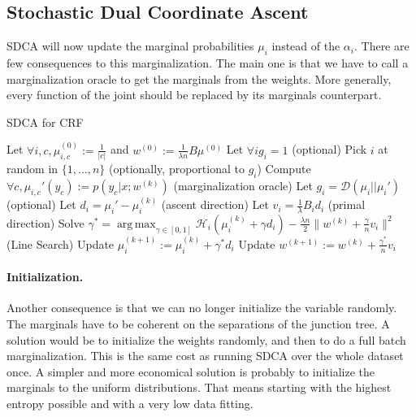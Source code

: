 \documentclass{article}
\DeclareMathOperator{\1}{\mathbb{1}}
\DeclareMathOperator*{\argmax}{arg\,max}
\begin{document}
\subsection{Stochastic Dual Coordinate Ascent}
SDCA will now update the marginal probabilities $\mu_i$ instead of the $\alpha_i$. 
There are few consequences to this marginalization.
The main one is that we have to call a marginalization oracle to get the marginals from the weights.
More generally, every function of the joint should be replaced by its marginals counterpart. 

\begin{algorithm}[ht]
    \caption{SDCA for CRF}%
    \label{sdca for crf}
\begin{algorithmic}
        \STATE Let $\forall i, c, \mu_{i, c}^{(0)} := \frac{1}{|c|}$ and $w^{(0)} := \frac{1}{\lambda n} B \mu^{(0)} $
        \STATE Let $\forall i g_i = 1$ (optional)
                \STATE Pick $i$ at random in $\{1,\ldots,n\}$ (optionally, proportional to $g_i$)
                \STATE Compute $\forall c, \mu_{i, c}' (y_c) := p(y_c|x; w^{(k)})$ (marginalization oracle)
                \STATE Let $g_i = \mathcal D(\mu_i || \mu_i')$ (optional)
                \STATE Let $d_i = \mu_i' - \mu_i^{(k)}$ (ascent direction)
                \STATE Let $v_i = \frac{1}{\lambda} B_i d_i $ (primal direction)
                \STATE Solve $\gamma^* = \argmax_{\gamma \in [0,1]} \mathcal H_i(\mu_i^{(k)} + \gamma d_i) - \frac{\lambda n}{2} \| w^{(k)} + \frac{\gamma}{n} v_i \|^2$ (Line Search)
               \STATE Update $\mu_i^{(k+1)} := \mu_i^{(k)} + \gamma^* d_i$
               \STATE Update $w^{(k+1)} := w^{(k)} + \frac{\gamma^*}{n} v_i $
        \ENDFOR
\end{algorithmic}
\end{algorithm}

\paragraph{Initialization.}
Another consequence is that we can no longer initialize the variable randomly. 
The marginals have to be coherent on the separations of the junction tree.
A solution would be to initialize the weights randomly, and then to do a full batch marginalization.
This is the same cost as running SDCA over the whole dataset once.
A simpler and more economical solution is probably to initialize the marginals to the uniform distributions.
That means starting with the highest entropy possible and with a very low data fitting.
\end{document}

